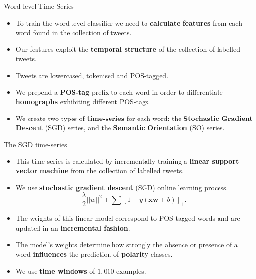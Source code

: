 \documentclass[handout]{beamer}
\begin{document}
\begin{frame}{Word-level Time-Series}
\begin{scriptsize}
\begin{itemize}
\item To train the word-level classifier we need to \textbf{calculate features} from each word found in the collection of tweets.
\item Our features exploit the \textbf{temporal structure} of the collection of labelled tweets.
\item Tweets are lowercased, tokenised and POS-tagged.

\item We prepend a \textbf{POS-tag} prefix to each word in order to differentiate \textbf{homographs} exhibiting different POS-tags.

\item We create two types of \textbf{time-series} for each word: the \textbf{Stochastic Gradient Descent} (SGD) series, and the \textbf{Semantic Orientation} (SO) series.

\end{itemize}
\end{scriptsize}

\end{frame}

\begin{frame}{The SGD time-series }
\begin{scriptsize}
\begin{itemize}
\item  This time-series is calculated by incrementally training a \textbf{linear support vector machine} from the collection of labelled tweets.
\item We use \textbf{stochastic gradient descent} (SGD) online learning process.
\begin{equation}\label{eq:sgd}
\frac{\lambda}{2}||w||^2+\sum [1- y (\mathbf{xw} +b) ]_{+}.
\end{equation}
\item The weights of this linear model correspond to POS-tagged words and are updated in an \textbf{incremental fashion}.
\item  The model's weights determine how strongly the absence or presence of a word \textbf{influences} the prediction of \textbf{polarity} classes.
\item We use \textbf{time windows} of $1,000$ examples.  

\end{itemize}
\end{scriptsize}

\end{frame}
\end{document}
